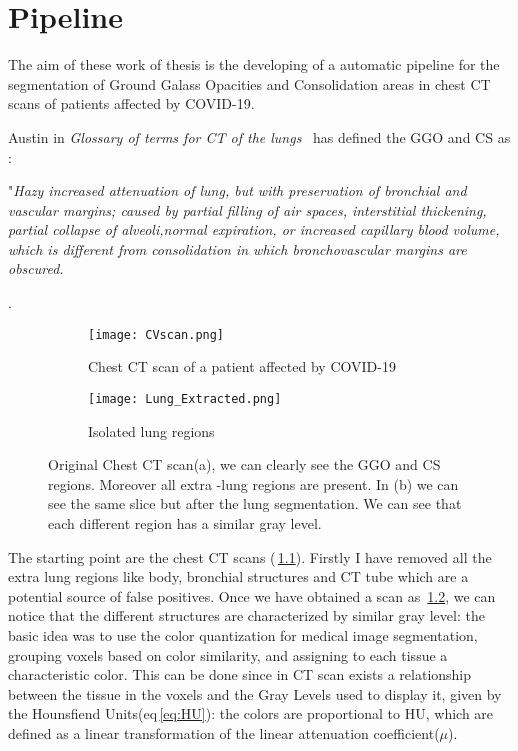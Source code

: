 \documentclass{standalone}
\begin{document}
	\chapter{Pipeline}
	
	The aim of these work of thesis is the developing of a automatic pipeline for the segmentation of Ground Galass Opacities and Consolidation areas in chest CT scans of patients affected by COVID-19.
	
	Austin in \textit{Glossary of terms for CT of the lungs}~\cite{ART:Austin} has defined the GGO and CS as : 
	\begin{center}
		"\emph{Hazy increased attenuation of lung, but with preservation of bronchial and vascular margins; caused by partial filling of air spaces, interstitial thickening, partial collapse of alveoli,normal expiration, or increased capillary blood volume, which is different from consolidation in which bronchovascular margins are obscured.}
	\end{center}. 

	\begin{figure}[ht]
		\begin{subfigure}{.5\textwidth}
			\centering
			\texttt{[image: CVscan.png]}  
			\caption{Chest CT scan of a patient affected by COVID-19}
			\label{fig:CTscan}
		\end{subfigure}
		\begin{subfigure}{.5\textwidth}
			\centering
			\texttt{[image: Lung\_Extracted.png]}  
			\caption{Isolated lung regions}
			\label{fig:lung}
		\end{subfigure}
		\caption{Original Chest CT scan(a), we can clearly see the GGO and CS regions. Moreover all extra -lung regions are present. In (b) we can see the same slice but after the lung segmentation. We can see that each different region has a similar gray level.}
		\label{fig:CTLung}
	\end{figure}


	The starting point are the chest CT scans (\figurename\,\ref{fig:CTscan}). Firstly I have removed all the extra lung regions like body, bronchial structures and CT tube which are a potential source of false positives. Once we have obtained a scan as \figurename\,\ref{fig:lung}, we can notice that  the different structures are characterized by similar gray level: the basic idea was to use the color quantization for medical image segmentation, grouping voxels based on color similarity, and  assigning  to each tissue a characteristic color. This can be done since in CT scan exists a relationship between the tissue in the voxels and the Gray Levels used to display it, given by the Hounsfiend Units(eq\,\ref{eq:HU}): the colors are proportional to HU, which are defined as a linear transformation of the linear attenuation coefficient($\mu$).
	
\end{document}
